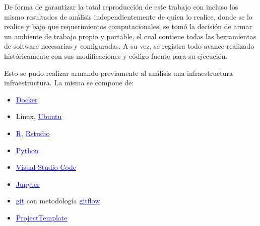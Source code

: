 De forma de garantizar la total reproducción de este trabajo con incluso los mismo resultados de análisis independientemente de quien lo realice, donde se lo realice y bajo que requerimientos computacionales, se tomó la decisión de armar un ambiente de trabajo propio y portable, el cual contiene todas las herramientas de software necesarias y configuradas. A su vez, se registra todo avance realizado históricamente con sus modificaciones y código fuente para su ejecución.

Esto se pudo realizar armando previamente al análisis una infraestructura infraestructura. La misma se compone de:

\begin{itemize}
\item \href{https://www.docker.com/}{\textcolor{blue}{\underline{Docker}}}
\item Linux, \href{https://ubuntu.com/}{\textcolor{blue}{\underline{Ubuntu}}}
\item \href{ https://www.r-project.org/}{\textcolor{blue}{\underline{R}}}, \href{https://rstudio.com/}{\textcolor{blue}{\underline{Rstudio}}}
\item \href{https://www.python.org/}{\textcolor{blue}{\underline{Python}}}
\item \href{https://code.visualstudio.com/}{\textcolor{blue}{\underline{Visual Studio Code}}}
\item \href{https://jupyter.org/}{\textcolor{blue}{\underline{Jupyter}}} 
\item \href{https://git-scm.com/}{\textcolor{blue}{\underline{git}}} con metodología \href{https://github.com/nvie/gitflow}{\textcolor{blue}{\underline{gitflow}}}
\item \href{http://projecttemplate.net/index.html}{\textcolor{blue}{\underline{ProjectTemplate}}} 
\end{itemize}

